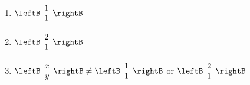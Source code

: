 \begin{multicols}{2}
\begin{supex}
\begin{enumerate}[label={\alph*.}]
\begin{enumerate}[label={\roman*.}]
\item $\leftB \begin{array}{r}
1 \\
1
\end{array}\rightB$


\item $\leftB \begin{array}{r}
2 \\
1
\end{array}\rightB$


\item $\leftB \begin{array}{r}
x \\
y
\end{array}\rightB \neq \leftB \begin{array}{r}
1 \\
1
\end{array}\rightB$ or $\leftB \begin{array}{r}
2 \\
1
\end{array}\rightB$





\end{enumerate}
\end{enumerate}
\end{supex}

\end{multicols}
